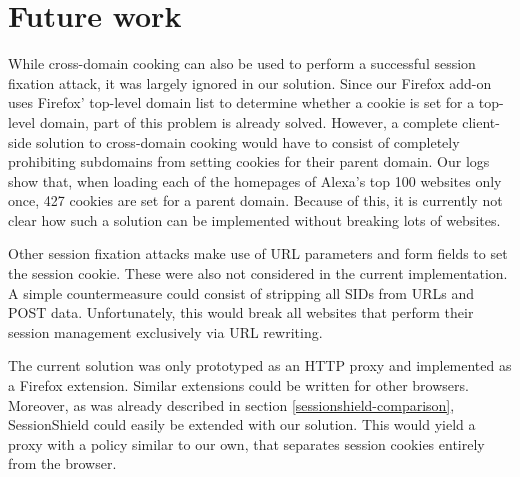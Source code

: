 \section{Future work}

While cross-domain cooking \cite{Zalewski2006} can also be used to
perform a successful session fixation attack, it was largely
ignored in our solution. Since our Firefox add-on uses Firefox'
top-level domain list to determine whether a cookie is set for
a top-level domain, part of this problem is already solved.
However, a complete client-side solution to cross-domain
cooking would have to consist of completely prohibiting subdomains from
setting cookies for their parent domain. Our logs show that,
when loading each of the homepages of Alexa's top 100
websites only once, 427 cookies are set for a parent domain.
Because of this, it is currently not clear how such a solution
can be implemented without breaking lots of websites.

Other session fixation attacks make use of URL parameters and form fields
to set the session cookie.
These were also not considered in the current implementation.
A simple countermeasure could consist of stripping all SIDs
from URLs and POST data. Unfortunately, this would break all websites that perform their session management exclusively via URL rewriting.

The current solution was only prototyped as an HTTP proxy
and implemented as a Firefox extension. Similar extensions
could be written for other browsers.
Moreover, as was already described in section \ref{sessionshield-comparison}, SessionShield could easily be extended with our solution. This would yield a proxy with a policy similar to our own, that separates session cookies entirely from the browser.
